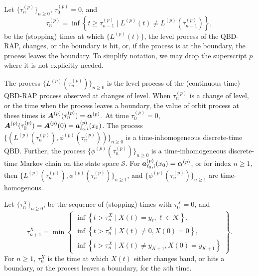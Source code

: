 Let \(\{\tau_n^{(p)}\}_{n\geq 0}\), \(\tau_0^{(p)}=0\), and
\[\tau_{n}^{(p)} = \inf\left\{t\geq \tau_{n-1}^{(p)} \mid L^{(p)}(t)\neq L^{(p)}(\tau_{n-1}^{(p)})\right\},\]
be the (stopping) times at which \(\{L^{(p)}(t)\}\), the level process of the QBD-RAP, changes, or the boundary is hit, or, if the process is at the boundary, the process leaves the boundary. To simplify notation, we may drop the superscript \(p\) where it is not explicitly needed. 

The process \(\{L^{(p)}(\tau_n^{(p)})\}_{n\geq 0}\) is the level process of the (continuous-time) QBD-RAP process observed at changes of level. When \(\tau_n^{(p)}\) is a change of level, or the time when the process leaves a boundary, the value of orbit process at these times is \(\boldsymbol A^{(p)}(\tau_n^{(p)}) = \boldsymbol \alpha^{(p)}\). At time \(\tau_0^{(p)} =0\), \(\boldsymbol A^{(p)}(\tau_0^{(p)})=\boldsymbol A^{(p)}(0) = \boldsymbol   a_{\ell_0,i}^{(p)}(x_0)\). The process \(\{(L^{(p)}(\tau_n^{(p)}),\phi^{(p)}(\tau_n^{(p)}))\}_{n\geq 0}\) is a time-inhomogeneous discrete-time QBD. Further, the process \(\{\phi^{(p)}(\tau_n^{(p)})\}_{n\geq 0}\) is a time-inhomogeneous discrete-time Markov chain on the state space \(\mathcal S\). For \(\boldsymbol   a_{\ell_0,i}^{(p)}(x_0) = \boldsymbol \alpha^{(p)}\), or for index \(n\geq 1\), then \(\{L^{(p)}(\tau_n^{(p)}),\phi^{(p)}(\tau_n^{(p)})\}_{n\geq 1}\), and \(\{\phi^{(p)}(\tau_n^{(p)})\}_{n\geq 1}\) are time-homogenous.

Let \(\{\tau_n^X\}_{n\geq 0}\), be the sequence of (stopping) times with \(\tau_0^X=0\), and 
\[\tau_{n+1}^X = \min\left\{\begin{array}{c}\inf\left\{t>\tau_n^X\mid X(t)=y_{\ell}, \ell\in\mathcal K\right\}, \\ \inf\left\{t>\tau_n^X \mid X(t) \neq 0, X(0)=0\right\}, \\ \inf\left\{t>\tau_n^X \mid X(t) \neq y_{K+1}, X(0)=y_{K+1}\right\} \end{array} \right\}.\]
For \(n\geq 1\), \(\tau_n^X\) is the time at which \(X(t)\) either changes band, or hits a boundary, or the process leaves a boundary, for the \(n\)th time. 

